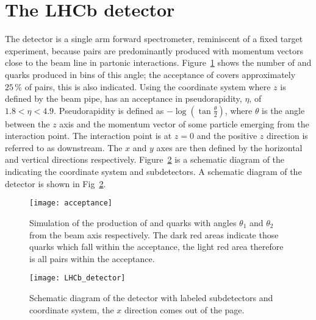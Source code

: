 \section{The LHCb detector}

The \lhcb detector is a single arm forward spectrometer, reminiscent of a fixed target experiment,
because \bbbar pairs are predominantly produced with momentum vectors close to the beam line in
partonic interactions.
Figure~\ref{fig:lhcb:bbbar} shows the number of \bquark and \bquarkbar quarks produced in bins of
this angle; the acceptance of \lhcb covers approximately $25\,\%$ of \bbbar pairs, this is also indicated.
Using the coordinate system where $z$ is defined by the \lhc beam pipe,
\lhcb has an acceptance in pseudorapidity, $\eta$, of $1.8<\eta<4.9$.  %
Pseudorapidity is defined as $-\log\left(\tan\tfrac\theta2\right)$, where $\theta$ is the angle
between the $z$ axis and the momentum vector of some particle emerging from the interaction point.
The interaction point is at $z=0$ and the positive $z$ direction is referred to as downstream.
The $x$ and $y$ axes are then defined by the horizontal and vertical directions respectively.
Figure~\ref{fig:lhcb:lhcb} is a schematic diagram of the \lhcb indicating the coordinate system and
subdetectors.
A schematic diagram of the \lhcb detector is shown in Fig~\ref{fig:lhcb:lhcb}.

\begin{figure}
  \begin{center}
    \texttt{[image: acceptance]}
  \end{center}
  \caption[Simulated production of $b\bar b$ pairs]
  {\small
    Simulation of the production of \bquark and \protect\bquarkbar quarks with angles $\theta_1$ and
    $\theta_2$ from the beam axis respectively.
    The dark red areas indicate those quarks which fall within the \lhcb acceptance, the light red
    area therefore is all \bbbar pairs within the acceptance.
  }
  \label{fig:lhcb:bbbar}
\end{figure}

\begin{figure}
  \begin{center}
    \texttt{[image: LHCb\_detector]}
  \end{center}
  \caption[\lhcb detector]
  {\small
    Schematic diagram of the \lhcb detector with labeled subdetectors and coordinate system, the
    $x$ direction comes out of the page.
  }
  \label{fig:lhcb:lhcb}
\end{figure}

